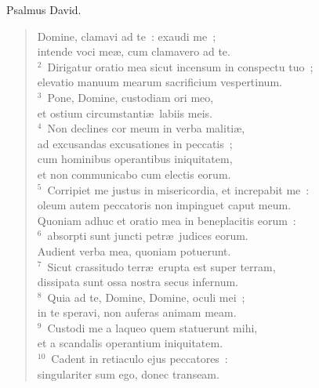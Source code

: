 \lettrine[lines=3,image=true,loversize=0.05,lraise=-0.03]{P}{}salmus David. \begin{flushleft}\begin{verse}\vspace{6pt}Domine, clamavi ad te~: exaudi me~;\\ intende voci me\ae , cum clamavero ad te.\\
${}^{2}$~Dirigatur oratio mea sicut incensum in conspectu tuo~;\\ elevatio manuum mearum sacrificium vespertinum.\\
${}^{3}$~Pone, Domine, custodiam ori meo,\\ et ostium circumstanti\ae\ labiis meis.\\
${}^{4}$~Non declines cor meum in verba maliti\ae ,\\ ad excusandas excusationes in peccatis~;\\ cum hominibus operantibus iniquitatem,\\ et non communicabo cum electis eorum.\\
${}^{5}$~Corripiet me justus in misericordia, et increpabit me~:\\ oleum autem peccatoris non impinguet caput meum.\\ Quoniam adhuc et oratio mea in beneplacitis eorum~:\\
${}^{6}$~absorpti sunt juncti petr\ae\ judices eorum.\\ Audient verba mea, quoniam potuerunt.\\
${}^{7}$~Sicut crassitudo terr\ae\ erupta est super terram,\\ dissipata sunt ossa nostra secus infernum.\\
${}^{8}$~Quia ad te, Domine, Domine, oculi mei~;\\ in te speravi, non auferas animam meam.\\
${}^{9}$~Custodi me a laqueo quem statuerunt mihi,\\ et a scandalis operantium iniquitatem.\\
${}^{10}$~Cadent in retiaculo ejus peccatores~:\\ singulariter sum ego, donec transeam.\end{verse}\end{flushleft}



